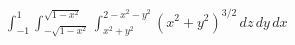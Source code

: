 \item $\int_{-1}^1 \int_{-\sqrt{1-x^2}}^{\sqrt{1-x^2}} \int_{x^2+y^2}^{2-x^2-y^2} (x^2 + y^2)^{3/2} \, dz \, dy \, dx$
